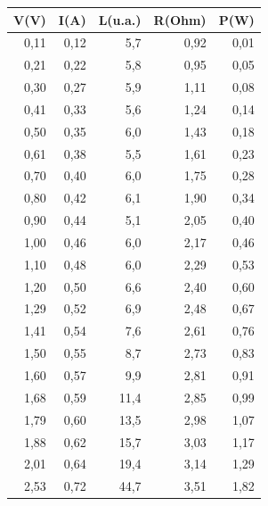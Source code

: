\documentclass[brazilian,12pt,a4paper,final]{article}
\begin{document}
\begin{table}[htbp]
\centering
\begin{tabular}{|r|r|r|r|r|} 
\hline
V(V)    &       I(A)    &       L(u.a.)       &       R(Ohm)  &       P(W)    \\
\hline
0,11    &       0,12    &       5,7     &       0,92    &       0,01    \\
0,21    &       0,22    &       5,8     &       0,95    &       0,05    \\
0,30    &       0,27    &       5,9     &       1,11    &       0,08    \\
0,41    &       0,33    &       5,6     &       1,24    &       0,14    \\
0,50    &       0,35    &       6,0     &       1,43    &       0,18    \\
0,61    &       0,38    &       5,5     &       1,61    &       0,23    \\
0,70    &       0,40    &       6,0     &       1,75    &       0,28    \\
0,80    &       0,42    &       6,1     &       1,90    &       0,34    \\
0,90    &       0,44    &       5,1     &       2,05    &       0,40    \\
1,00    &       0,46    &       6,0     &       2,17    &       0,46    \\
1,10    &       0,48    &       6,0     &       2,29    &       0,53    \\
1,20    &       0,50    &       6,6     &       2,40    &       0,60    \\
1,29    &       0,52    &       6,9     &       2,48    &       0,67    \\
1,41    &       0,54    &       7,6     &       2,61    &       0,76    \\
1,50    &       0,55    &       8,7     &       2,73    &       0,83    \\
1,60    &       0,57    &       9,9     &       2,81    &       0,91    \\
1,68    &       0,59    &       11,4    &       2,85    &       0,99    \\
1,79    &       0,60    &       13,5    &       2,98    &       1,07    \\
1,88    &       0,62    &       15,7    &       3,03    &       1,17    \\
2,01    &       0,64    &       19,4    &       3,14    &       1,29    \\
2,53    &       0,72    &       44,7    &       3,51    &       1,82    \\

\end{tabular}
\end{table}
\end{document}

